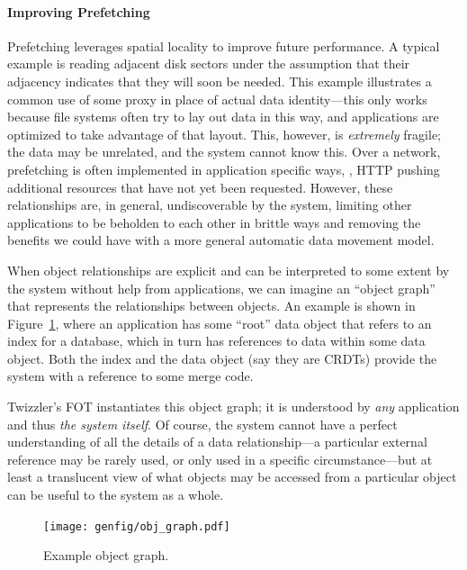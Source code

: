 {    \paragraph{Improving Prefetching}
    \label{sec:prefetch}

    Prefetching leverages spatial locality to improve future performance. A typical example is
    reading adjacent disk sectors under the assumption that their adjacency indicates that they
    will soon be needed. This example illustrates a common use of some proxy in place of actual data
    identity---this only works because file systems often try to lay out data in this way, and
    applications are optimized to take advantage of that layout. This, however, is \emph{extremely}
    fragile; the data may be unrelated, and the system cannot know this. Over a network, prefetching is
    often implemented in application specific ways, \eg, HTTP pushing additional resources that have
    not yet been requested. However, these relationships are, in general, undiscoverable by the system,
    limiting other applications to be beholden to each other in brittle ways
    and removing the benefits we could have with a more general automatic data movement
    model.

    When object relationships are explicit and can be interpreted to some extent by the
    system without help from applications, we can imagine an ``object graph'' that represents the
    relationships between objects. An example is shown in Figure~\ref{fig:ograph}, where
    an application has some ``root'' data object that refers to an index for a database, which in turn
    has references to data within some data object. Both the index and the data object (say they are
    CRDTs) provide the system with a reference to some merge code.

    Twizzler's FOT instantiates this object graph; it is understood by \emph{any} application
    and thus \emph{the system itself}.
    Of course, the system cannot have a
    perfect understanding of all the details of a data relationship---a particular external reference
    may be rarely used, or only used in a specific circumstance---but at least a translucent view of
    what objects may be accessed from a particular object can be useful to the system as a whole.

    \begin{figure}
        \centering
        \texttt{[image: genfig/obj\_graph.pdf]}
        \caption{Example object graph.}
        \label{fig:ograph}
    \end{figure}

}
